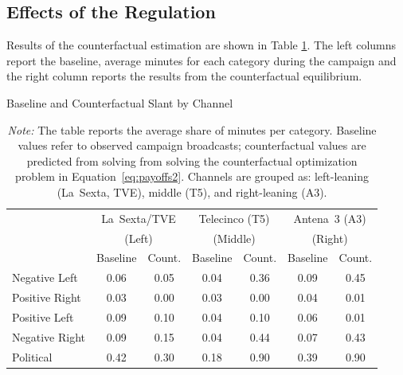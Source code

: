\documentclass[12pt]{article}
\begin{document}



\subsection{Effects of the Regulation}

Results of the counterfactual estimation are shown in Table \ref{tab:counter}.  The left columns report the baseline, average minutes for each category during the campaign and the right column reports the results from the counterfactual equilibrium. 



\begin{table}[!htbp]
	\caption{Baseline and Counterfactual Slant by Channel}
	\label{tab:counter}
	\centering\small
	\begin{tabular}{lcccccc}
		\toprule
		& \multicolumn{2}{c}{La~Sexta/TVE} & \multicolumn{2}{c}{Telecinco (T5)} & \multicolumn{2}{c}{Antena~3 (A3)} \\
		& \multicolumn{2}{c}{(Left)} & \multicolumn{2}{c}{(Middle)} & \multicolumn{2}{c}{(Right)} \\
		& Baseline & Count. & Baseline & Count. & Baseline & Count. \\
		\midrule
		Negative Left & 0.06 & 0.05 & 0.04 & 0.36 & 0.09 & 0.45 \\
		\midrule
		Positive Right & 0.03 & 0.00 & 0.03 & 0.00 & 0.04 & 0.01 \\
		\midrule
		Positive Left & 0.09 & 0.10 & 0.04 & 0.10 & 0.06 & 0.01 \\
		\midrule
		Negative Right & 0.09 & 0.15 & 0.04 & 0.44 & 0.07 & 0.43 \\
		\midrule
		Political & 0.42 & 0.30 & 0.18 & 0.90 & 0.39 & 0.90 \\
		\midrule
		\bottomrule
	\end{tabular}
	\vspace{0.5em}
	\caption*{\small \emph{Note:} The table reports the average share of minutes per category. Baseline values refer to observed campaign broadcasts; counterfactual values are predicted from solving from solving the counterfactual optimization problem in Equation~\eqref{eq:payoffs2}.      Channels are grouped as: left-leaning (La~Sexta, TVE), middle (T5), and right-leaning (A3).}
\end{table}


\end{document}
